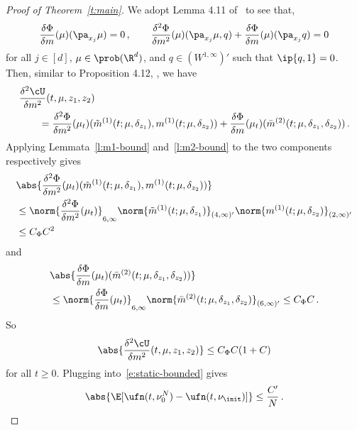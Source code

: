 \documentclass{amsart}
\begin{document}
\begin{proof}[Proof of Theorem~\ref{t:main}]
    We adopt Lemma 4.11 of~\cite{DelarueTse2021} to see that,
    \begin{equation}
        \frac{\delta \Phi}{\delta m}(\mu) (\pa_{x_j} \mu) = 0 \,, \qquad \frac{\delta^2 \Phi}{\delta m^2}(\mu) (\pa_{x_j} \mu, q) + \frac{\delta \Phi}{\delta m}(\mu)(\pa_{x_j} q) = 0 
    \end{equation}
    for all $j \in [d]$, $\mu \in \prob(\R^d)$, and $q \in (W^{1,\infty})'$ such that $\ip{q,1} = 0$.
    Then, similar to Proposition 4.12, \cite{DelarueTse2021}, we have 
    \begin{align*}
        & \frac{\delta^2 \cU}{\delta m^2} (t,\mu,z_1,z_2) \\
        & \qquad = \frac{\delta^2 \Phi}{\delta m^2}(\mu_t) (\tilde m^{(1)}(t;\mu,\delta_{z_1}), m^{(1)}(t;\mu,\delta_{z_2})) + \frac{\delta \Phi}{\delta m} (\mu_t) (\bar m^{(2)} (t;\mu,\delta_{z_1},\delta_{z_2})) \,.
    \end{align*}
    Applying Lemmata~\ref{l:m1-bound} and~\ref{l:m2-bound} to the two components respectively gives 
    \begin{align*}
        & \abs{\frac{\delta^2 \Phi}{\delta m^2}(\mu_t) (\tilde m^{(1)}(t;\mu,\delta_{z_1}), m^{(1)}(t;\mu,\delta_{z_2}))} \\
        & \le \norm{\frac{\delta^2 \Phi}{\delta m^2}(\mu_t) }_{6,\infty} \norm{\tilde m^{(1)}(t;\mu,\delta_{z_1})}_{(4,\infty)'} \norm{m^{(1)}(t;\mu,\delta_{z_2})}_{(2,\infty)'} \\
        & \le C_\Phi C^2 
    \end{align*}
    and 
    \begin{align*}
        & \abs{\frac{\delta \Phi}{\delta m} (\mu_t) (\bar m^{(2)}(t;\mu,\delta_{z_1},\delta_{z_2}))} \\
        & \le \norm{\frac{\delta \Phi}{\delta m} (\mu_t)}_{6,\infty} \norm{ \bar m^{(2)}(t;\mu,\delta_{z_1},\delta_{z_2}) }_{(6,\infty)'} \le C_\Phi C \,.
    \end{align*}
    So
    \begin{equation*}
        \abs{ \frac{\delta^2 \cU}{\delta m^2} (t,\mu,z_1,z_2) } \le C_\Phi C (1+C) 
    \end{equation*}
    for all $t \ge 0$. 
    Plugging into~\eqref{e:static-bounded} gives 
    \begin{equation*}
        \abs{\E[\ufn(t,\nu^N_0) - \ufn(t,\nu_{\init})]} \le \frac{C'}{N} \,.
    \end{equation*}
    

\end{proof}
\end{document}
